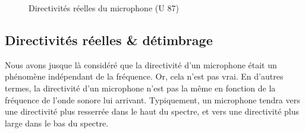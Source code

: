 \documentclass[
  letterpaper,
  DIV=11,
  numbers=noendperiod]{scrreprt}
\begin{document}
\begin{figure}

\begin{minipage}[t]{0.33\linewidth}

{\centering 


}

\end{minipage}%
%
\begin{minipage}[t]{0.33\linewidth}

{\centering 


}

\end{minipage}%
%
\begin{minipage}[t]{0.33\linewidth}

{\centering 


}

\end{minipage}%

\caption{\label{fig-u87dir}Directivités réelles du microphone (U 87)}

\end{figure}

\hypertarget{directivituxe9s-ruxe9elles-duxe9timbrage}{%
\subsection{Directivités réelles \&
détimbrage}\label{directivituxe9s-ruxe9elles-duxe9timbrage}}

Nous avons jusque là considéré que la directivité d'un microphone était
un phénomène indépendant de la fréquence. Or, cela n'est pas vrai. En
d'autres termes, la directivité d'un microphone n'est pas la même en
fonction de la fréquence de l'onde sonore lui arrivant. Typiquement, un
microphone tendra vers une directivité plus resserrée dans le haut du
spectre, et vers une directivité plus large dans le bas du spectre.
\end{document}
